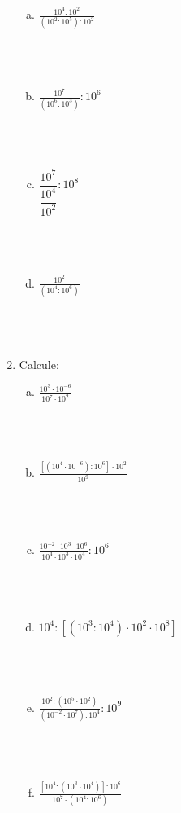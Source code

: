 \documentclass[a4paper,14pt]{article}
\begin{document}
\begin{multicols}{2}
\begin{enumerate}
\begin{enumerate}[a)]
				\item $\frac{10^4 : 10^2}{(10^2 : 10^5) : 10^2}$ \\\\\\\\
				\item $\frac{10^7}{(10^6 : 10^3)} : 10^6$ \\\\\\\\
				\item $\dfrac{10^7}{\dfrac{10^4}{10^2}} : 10^8$ \\\\\\\\
				\item $\frac{10^2}{(10^4 : 10^6)}$ \\\\\\\\
			\end{enumerate}
			\item Calcule:
			\begin{enumerate}[a)]
				\item $\frac{10^3 \cdot 10^{-6}}{10^7 \cdot 10^2}$ \\\\\\\\
				\item $\frac{[(10^4 \cdot 10^{-6}) : 10^6] \cdot 10^2}{10^9}$ \\\\\\\\
				\item $\frac{10^{-2} \cdot 10^3 \cdot 10^6}{10^4 \cdot 10^3 \cdot 10^4} : 10^6$ \\\\\\\\
				\item $10^4 : [(10^3 : 10^4) \cdot 10^2 \cdot 10^8]$ \\\\\\\\
				\item $\frac{10^2 : (10^5 \cdot 10^2)}{(10^{-2} \cdot 10^7) : 10^4} : 10^9$ \\\\\\\\
				\item $\frac{[10^4 : (10^3 \cdot 10^4)] : 10^6}{10^7 \cdot (10^4 : 10^6)}$ \\\\\\\\

\end{enumerate}
\end{enumerate}
\end{multicols}
\end{document}
